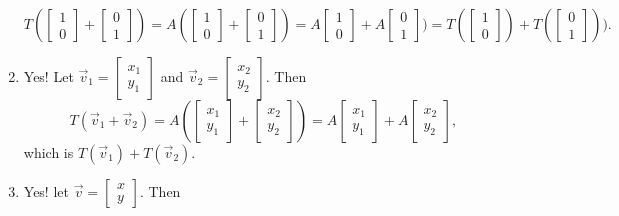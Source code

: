 \begin{SaveQuestion}
\begin{enumerate}
		$$
		T( \begin{bmatrix}1\\0\end{bmatrix} + \begin{bmatrix}0\\1\end{bmatrix})  = A ( \begin{bmatrix}1\\0\end{bmatrix} + \begin{bmatrix}0\\1\end{bmatrix}) = 
		A \begin{bmatrix}1\\0\end{bmatrix} + A \begin{bmatrix}0\\1\end{bmatrix}) = T( \begin{bmatrix}1\\0\end{bmatrix}) + T( \begin{bmatrix}0\\1\end{bmatrix}) ).$$
  \item Yes!  Let $\vec v_1 =  \begin{bmatrix}x_1\\ y_1 \end{bmatrix}$ and $\vec v_2 =  \begin{bmatrix}x_2\\ y_2 \end{bmatrix}$. Then  
			$$T(\vec v_1 + \vec v_2) = A  (\begin{bmatrix}x_1\\ y_1 \end{bmatrix}+   \begin{bmatrix}x_2\\ y_2 \end{bmatrix}) = 
			A  \begin{bmatrix}x_1\\ y_1 \end{bmatrix} +  A \begin{bmatrix}x_2\\ y_2 \end{bmatrix},$$ which is 
			$T(\vec v_1) + T(\vec v_2).$
   \item Yes! let $\vec v = \begin{bmatrix}x\\ y\end{bmatrix}. $ Then 

\end{enumerate}
\end{SaveQuestion}
